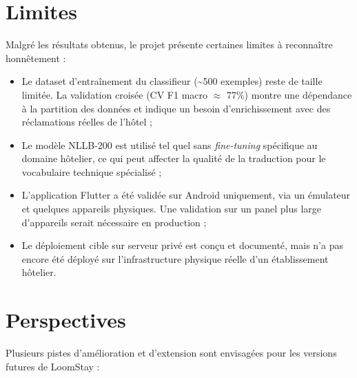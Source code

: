 \section*{Limites}

Malgré les résultats obtenus, le projet présente certaines limites à reconnaître honnêtement :

\begin{itemize}
  \item Le dataset d'entraînement du classifieur (\textasciitilde{}500 exemples) reste de taille limitée. La validation croisée (CV F1 macro $\approx$ 77\%) montre une dépendance à la partition des données et indique un besoin d'enrichissement avec des réclamations réelles de l'hôtel ;
  \item Le modèle NLLB-200 est utilisé tel quel sans \textit{fine-tuning} spécifique au domaine hôtelier, ce qui peut affecter la qualité de la traduction pour le vocabulaire technique spécialisé ;
  \item L'application Flutter a été validée sur Android uniquement, via un émulateur et quelques appareils physiques. Une validation sur un panel plus large d'appareils serait nécessaire en production ;
  \item Le déploiement cible sur serveur privé est conçu et documenté, mais n'a pas encore été déployé sur l'infrastructure physique réelle d'un établissement hôtelier.
\end{itemize}

\section*{Perspectives}

Plusieurs pistes d'amélioration et d'extension sont envisagées pour les versions futures de LoomStay :

